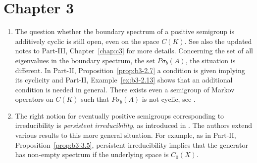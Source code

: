 \section*{Chapter 3}
\begin{enumerate}

\item
The question whether the boundary spectrum of a positive semigroup is additively cyclic is still open, even on the space $C(K)$. 
See also the updated notes to Part-III, Chapter~\ref{chap:c3} for more details.
Concerning the set of all eigenvalues in the boundary spectrum, \ie the set $P\sigma_{b}(A)$, the situation is different. 
In Part-II, Proposition~\ref{prop:b3-2.7} a condition is given implying its cyclicity and Part-II, Example~\ref{ex:b3-2.13} shows that an additional condition is needed in general. 
There exists even a semigroup of Markov operators on  $C(K)$ such that $P\sigma_{b}(A)$ is not cyclic, see \textcite{zbmath06591946}. 

\item 
The right notion for eventually positive semigroups corresponding to irreducibility is \emph{persistent irreducibility}, as introduced in \textcite{zbmath07889246}. 
The authors extend various results to this more general situation. 
For example, as in Part-II, Proposition~\ref{prop:b3-3.5},  persistent irreducibility implies that the generator has non-empty spectrum if the underlying space is $C_0(X)$. 

\end{enumerate}
